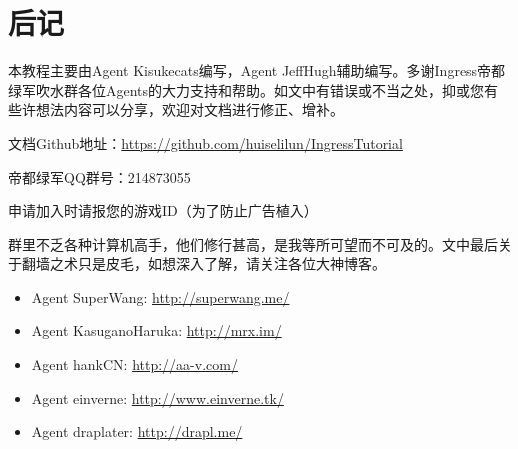 \documentclass[a4paper]{article}
\begin{document}
\section{后记}
本教程主要由Agent Kisukecats编写，Agent JeffHugh辅助编写。多谢Ingress帝都绿军吹水群各位Agents的大力支持和帮助。如文中有错误或不当之处，抑或您有些许想法内容可以分享，欢迎对文档进行修正、增补。\par

文档Github地址：\url{https://github.com/huiselilun/IngressTutorial}\par

帝都绿军QQ群号：214873055 \par
申请加入时请报您的游戏ID（为了防止广告植入）\par

群里不乏各种计算机高手，他们修行甚高，是我等所可望而不可及的。文中最后关于翻墙之术只是皮毛，如想深入了解，请关注各位大神博客。
\begin{itemize}
\item Agent SuperWang: \url{http://superwang.me/}
\item Agent KasuganoHaruka: \url{http://mrx.im/}
\item Agent hankCN: \url{http://aa-v.com/}
\item Agent einverne: \url{http://www.einverne.tk/}
\item Agent draplater: \url{http://drapl.me/}

\end{itemize}
\end{document}
